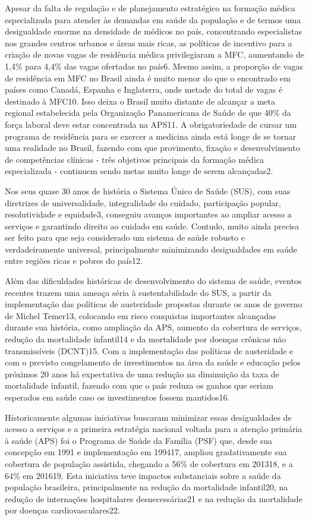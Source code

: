 \documentclass[]{book}
\begin{document}
Apesar da falta de regulação e de planejamento estratégico na formação médica especializada para atender às demandas em saúde da população e de termos uma desigualdade enorme na densidade de médicos no país, concentrando especialistas nos grandes centros urbanos e áreas mais ricas, as políticas de incentivo para a criação de novas vagas de residência médica privilegiaram a MFC, aumentando de 1,4\% para 4,4\% das vagas ofertadas no país6. Mesmo assim, a proporção de vagas de residência em MFC no Brasil ainda é muito menor do que o encontrado em países como Canadá, Espanha e Inglaterra, onde metade do total de vagas é destinado à MFC10. Isso deixa o Brasil muito distante de alcançar a meta regional estabelecida pela Organização Panamericana de Saúde de que 40\% da força laboral deve estar concentrada na APS11. A obrigatoriedade de cursar um programa de residência para se exercer a medicina ainda está longe de se tornar uma realidade no Brasil, fazendo com que provimento, fixação e desenvolvimento de competências clínicas - três objetivos principais da formação médica especializada - continuem sendo metas muito longe de serem alcançadas2.

Nos seus quase 30 anos de história o Sistema Único de Saúde (SUS), com suas diretrizes de universalidade, integralidade do cuidado, participação popular, resolutividade e equidade3, conseguiu avanços importantes ao ampliar acesso a serviços e garantindo direito ao cuidado em saúde. Contudo, muito ainda precisa ser feito para que seja considerado um sistema de saúde robusto e verdadeiramente universal, principalmente minimizando desigualdades em saúde entre regiões ricas e pobres do país12.

Além das dificuldades históricas de desenvolvimento do sistema de saúde, eventos recentes trazem uma ameaça séria à sustentabilidade do SUS, a partir da implementação das políticas de austeridade propostas durante os anos de governo de Michel Temer13, colocando em risco conquistas importantes alcançadas durante sua história, como ampliação da APS, aumento da cobertura de serviços, redução da mortalidade infantil14 e da mortalidade por doenças crônicas não transmissíveis (DCNT)15. Com a implementação das políticas de austeridade e com o previsto congelamento de investimentos na área da saúde e educação pelos próximos 20 anos há expectativa de uma redução na diminuição da taxa de mortalidade infantil, fazendo com que o país reduza os ganhos que seriam esperados em saúde caso os investimentos fossem mantidos16.

Historicamente algumas iniciativas buscaram minimizar essas desigualdades de acesso a serviços e a primeira estratégia nacional voltada para a atenção primária à saúde (APS) foi o Programa de Saúde da Família (PSF) que, desde sua concepção em 1991 e implementação em 199417, ampliou gradativamente sua cobertura de população assistida, chegando a 56\% de cobertura em 201318, e a 64\% em 201619. Esta iniciativa teve impactos substanciais sobre a saúde da população brasileira, principalmente na redução da mortalidade infantil20, na redução de internações hospitalares desnecessárias21 e na redução da mortalidade por doenças cardiovasculares22.
\end{document}
